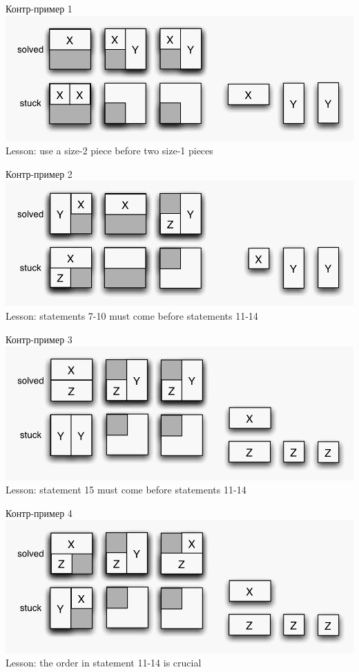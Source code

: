 \documentclass[aspectratio=169
  , xcolor={svgnames}
  , hyperref={ colorlinks,citecolor=DeepPink4
             , linkcolor=DarkRed,urlcolor=DarkBlue}
  , russian
  ]{beamer}
\theoremstyle{exerciseStyle1}
\begin{document}
\begin{frame}[fragile]{Контр-пример 1}
\includegraphics[width=0.9\paperwidth]{figures/ce1.png}
Lesson: use a size-2 piece before two size-1 pieces
\end{frame}

\begin{frame}[fragile]{Контр-пример 2}
\includegraphics[width=0.9\paperwidth]{figures/ce2.png}
Lesson: statements 7-10 must come before statements 11-14
\end{frame}

\begin{frame}[fragile]{Контр-пример 3}
\includegraphics[width=0.9\paperwidth]{figures/ce3.png}
Lesson: statement 15 must come before statements 11-14
\end{frame}

\begin{frame}[fragile]{Контр-пример 4}
\includegraphics[width=0.9\paperwidth]{figures/ce4.png}
Lesson: the order in statement 11-14 is crucial
\end{frame}
\end{document}
